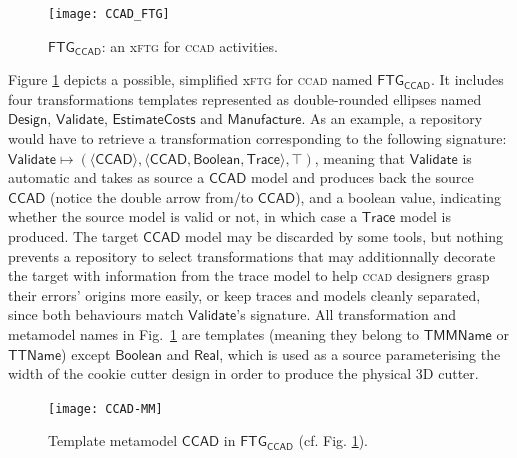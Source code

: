 \begin{figure}[t]
   \centering
   \texttt{[image: CCAD\_FTG]}
   \caption{$\mathsf{FTG_{CCAD}}$: an x\textsc{ftg} for \textsc{ccad} 
activities.}%
   \label{fig:CCAD-FTG}%
\end{figure}

Figure \ref{fig:CCAD-FTG} depicts a possible, simplified x\textsc{ftg} for 
\textsc{ccad} named $\mathsf{FTG_{CCAD}}$. It includes four transformations 
templates represented as double-rounded ellipses named $\mathsf{Design}$, 
$\mathsf{Validate}$, $\mathsf{EstimateCosts}$ and $\mathsf{Manufacture}$. As an 
example, a repository would have to retrieve a transformation corresponding to
the following signature: $\mathsf{Validate} \mapsto 
(\langle\mathsf{CCAD}\rangle, \langle \mathsf{CCAD}, \mathsf{Boolean}, 
\mathsf{Trace}\rangle, \top)$, meaning that $\mathsf{Validate}$ is automatic and 
takes as source a $\mathsf{CCAD}$ model and produces back the source 
$\mathsf{CCAD}$ (notice the double arrow from/to $\mathsf{CCAD}$), and a 
boolean value, indicating whether the source model is valid or not, in which 
case a $\mathsf{Trace}$ model is produced. The target $\mathsf{CCAD}$ model may 
be discarded by some tools, but nothing prevents a repository to select 
transformations that may additionnally decorate the target with information 
from the trace model to help \textsc{ccad} designers grasp their errors' 
origins more easily, or keep traces and models cleanly separated, since both 
behaviours match $\mathsf{Validate}$'s signature. All transformation and 
metamodel names in Fig.~\ref{fig:CCAD-FTG} are templates (meaning they belong 
to $\mathsf{TMMName}$ or $\mathsf{TTName}$) except $\mathsf{Boolean}$ and 
$\mathsf{Real}$, which is used as a source parameterising the width of the 
cookie cutter design in order to produce the physical 3D cutter.

\begin{figure}[t]
\centering
\texttt{[image: CCAD-MM]}
\caption{Template metamodel $\mathsf{CCAD}$ in $\mathsf{FTG_{CCAD}}$ 
(cf. Fig. \ref{fig:CCAD-FTG}).}
\label{fig:CCAD-MM}%

\vspace{-0.5cm}
\end{figure}

